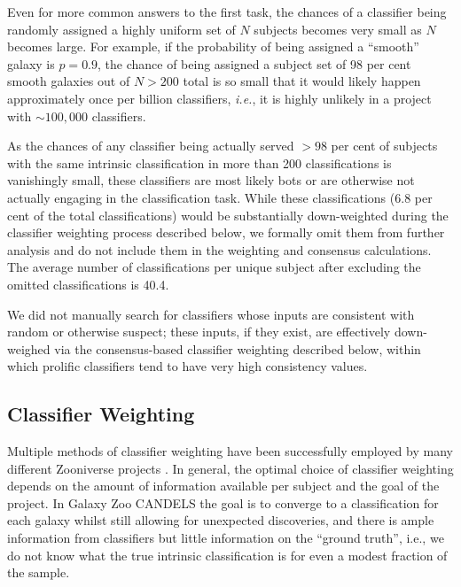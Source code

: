 \documentclass[useAMS,usenatbib]{mn2e}
\begin{document}
{Even for more common answers to the first task, the chances of a classifier being randomly assigned a highly uniform set of $N$ subjects becomes very small as $N$ becomes large. For example, if the probability of being assigned a ``smooth'' galaxy is $p = 0.9$, the chance of being assigned a subject set of 98 per cent smooth galaxies out of $N > 200$ total is so small that it would likely happen approximately once per billion classifiers, \emph{i.e.}, it is highly unlikely in a project with $\sim 100,000$ classifiers.

As the chances of any classifier being actually served $> 98$ per cent of subjects with the same intrinsic classification in more than 200 classifications is vanishingly small, these classifiers are most likely bots or are otherwise not actually engaging in the classification task. While these classifications ($6.8$ per cent of the total classifications) would be substantially down-weighted during the classifier weighting process described below, we formally omit them from further analysis and do not include them in the weighting and consensus calculations. The average number of classifications per unique subject after excluding the omitted classifications is 40.4. 

We did not manually search for classifiers whose inputs are consistent with random or otherwise suspect; these inputs, if they exist, are effectively down-weighed via the consensus-based classifier weighting described below, within which prolific classifiers tend to have very high consistency values.

\subsection{Classifier Weighting} \label{sec:weighting}

Multiple methods of classifier weighting have been successfully employed by many different Zooniverse projects \citep{lintott08, bamford09, lintott11, rsimpson12, schwamb12,esimpson13, johnson15, marshall16}. In general, the optimal choice of classifier weighting depends on the amount of information available per subject and the goal of the project. In Galaxy Zoo CANDELS the goal is to converge to a classification for each galaxy whilst still allowing for unexpected discoveries, and there is ample information from classifiers but little information on the ``ground truth'', i.e., we do not know what the true intrinsic classification is for even a modest fraction of the sample.

}
\end{document}
